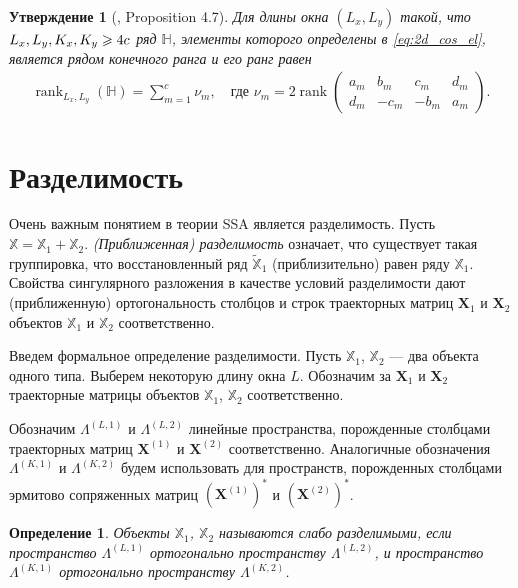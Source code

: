 \documentclass[specialist,
               substylefile = spbu.rtx,
               subf,href,colorlinks=true, 12pt]{disser}
\def\rank{\mathop{\mathrm{rank}}}
\newtheorem{defn}{Определение}
\newtheorem{Th}{Утверждение}
\begin{document}
\begin{Th}[\cite{Golyandina.Usevich2010}, Proposition 4.7] \label{th:2d_rank_cos}
Для длины окна $(L_x, L_y)$ такой, что $L_x, L_y, K_x, \\K_y \geqslant 4c$ ряд $\mathbb{H}$, элементы которого определены в \eqref{eq:2d_cos_el}, является рядом конечного ранга и его ранг равен
\begin{gather*}
\rank_{L_x, L_y}(\mathbb{H}) = \sum_{m=1}^{c}{\nu_m}, \quad \text{где } \nu_m=2\rank
 \left(
  \begin{matrix}
a_m &b_m &c_m &d_m \\
d_m &-c_m &-b_m &a_m
\end{matrix}
\right).
\end{gather*}
\end{Th}

\section{Разделимость}
\label{sec:separability}
Очень важным понятием в теории SSA является разделимость. Пусть $\mathbb{X} = \mathbb{X}_1 + \mathbb{X}_2$. \textit{(Приближенная) разделимость} означает, что существует такая группировка, что восстановленный ряд $\widetilde{\mathbb{X}}_1$ (приблизительно) равен ряду $\mathbb{X}_1$.
Свойства сингулярного разложения в качестве условий разделимости дают (приближенную) ортогональность столбцов и строк траекторных матриц $\mathbf{X}_1$  и  $\mathbf{X}_2$ объектов $\mathbb{X}_1$ и $\mathbb{X}_2$ соответственно.

Введем формальное определение разделимости.
Пусть  $\mathbb{X}_1$,  $\mathbb{X}_2$ --- два объекта одного типа. Выберем некоторую длину окна $L$. Обозначим за $\mathbf{X}_1$  и  $\mathbf{X}_2$ траекторные матрицы объектов $\mathbb{X}_1$,  $\mathbb{X}_2$ соответственно.

Обозначим  $\Lambda^{(L,1)}$  и $\Lambda^{(L,2)}$  линейные пространства, порожденные столбцами траекторных матриц   $\mathbf{X}^{(1)}$  и  $\mathbf{X}^{(2)}$  соответственно. Аналогичные обозначения  $\Lambda^{(K,1)}$  и $\Lambda^{(K,2)}$  будем использовать для пространств, порожденных столбцами эрмитово сопряженных матриц $(\mathbf{X}^{(1)})^\mathrm{*}$  и  $(\mathbf{X}^{(2)})^\mathrm{*}$.

\begin{defn}
Объекты $\mathbb{X}_1$,  $\mathbb{X}_2$ называются \emph{слабо разделимыми}, если пространство $\Lambda^{(L,1)}$ ортогонально пространству $\Lambda^{(L,2)}$, и пространство $\Lambda^{(K,1)}$  ортогонально пространству $\Lambda^{(K,2)}$.
\end{defn}
\end{document}

